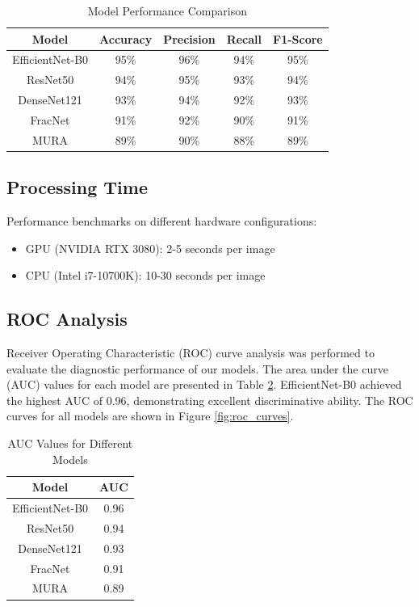 \documentclass[conference]{IEEEtran}
\begin{document}
\begin{table}[htbp]
\caption{Model Performance Comparison}
\begin{center}
\begin{tabular}{|c|c|c|c|c|}
\hline
\textbf{Model} & \textbf{Accuracy} & \textbf{Precision} & \textbf{Recall} & \textbf{F1-Score} \\
\hline
EfficientNet-B0 & 95\% & 96\% & 94\% & 95\% \\
ResNet50 & 94\% & 95\% & 93\% & 94\% \\
DenseNet121 & 93\% & 94\% & 92\% & 93\% \\
FracNet & 91\% & 92\% & 90\% & 91\% \\
MURA & 89\% & 90\% & 88\% & 89\% \\
\hline
\end{tabular}
\end{center}
\label{tab:model_performance}
\end{table}

\subsection{Processing Time}
Performance benchmarks on different hardware configurations:
\begin{itemize}
    \item GPU (NVIDIA RTX 3080): 2-5 seconds per image
    \item CPU (Intel i7-10700K): 10-30 seconds per image
\end{itemize}

\subsection{ROC Analysis}
Receiver Operating Characteristic (ROC) curve analysis was performed to evaluate the diagnostic performance of our models. The area under the curve (AUC) values for each model are presented in Table \ref{tab:auc_values}. EfficientNet-B0 achieved the highest AUC of 0.96, demonstrating excellent discriminative ability. The ROC curves for all models are shown in Figure \ref{fig:roc_curves}.

\begin{table}[htbp]
\caption{AUC Values for Different Models}
\begin{center}
\begin{tabular}{|c|c|}
\hline
\textbf{Model} & \textbf{AUC} \\
\hline
EfficientNet-B0 & 0.96 \\
ResNet50 & 0.94 \\
DenseNet121 & 0.93 \\
FracNet & 0.91 \\
MURA & 0.89 \\
\hline
\end{tabular}
\end{center}
\label{tab:auc_values}
\end{table}
\end{document}
